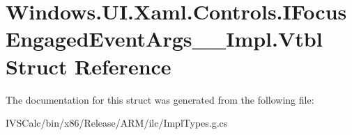 \hypertarget{struct_windows_1_1_u_i_1_1_xaml_1_1_controls_1_1_i_focus_engaged_event_args_____impl_1_1_vtbl}{}\section{Windows.\+U\+I.\+Xaml.\+Controls.\+I\+Focus\+Engaged\+Event\+Args\+\_\+\+\_\+\+Impl.\+Vtbl Struct Reference}
\label{struct_windows_1_1_u_i_1_1_xaml_1_1_controls_1_1_i_focus_engaged_event_args_____impl_1_1_vtbl}


The documentation for this struct was generated from the following file\+:\begin{DoxyCompactItemize}
\item 
I\+V\+S\+Calc/bin/x86/\+Release/\+A\+R\+M/ilc/Impl\+Types.\+g.\+cs\end{DoxyCompactItemize}
